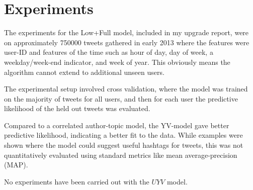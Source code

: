 \documentclass[10pt,fleqn]{article}
\begin{document}
\section{Experiments}

The experiments for the Low+Full model, included in my upgrade report, were on approximately 750000 tweets gathered in early 2013 where the features were user-ID and features of the time such as hour of day, day of week, a weekday/week-end indicator, and week of year. This obviously means the algorithm cannot extend to additional unseen users.

The experimental setup involved cross validation, where the model was trained on the majority of tweets for all users, and then for each user the predictive likelihood of the held out tweets was evaluated. 

Compared to a correlated author-topic model, the YV-model gave better predictive likelihood, indicating a better fit to the data. While examples were shown where the model could suggest useful hashtags for tweets, this was not quantitatively evaluated using standard metrics like mean average-precision (MAP).


No experiments have been carried out with the $UYV$ model.




\end{document}
